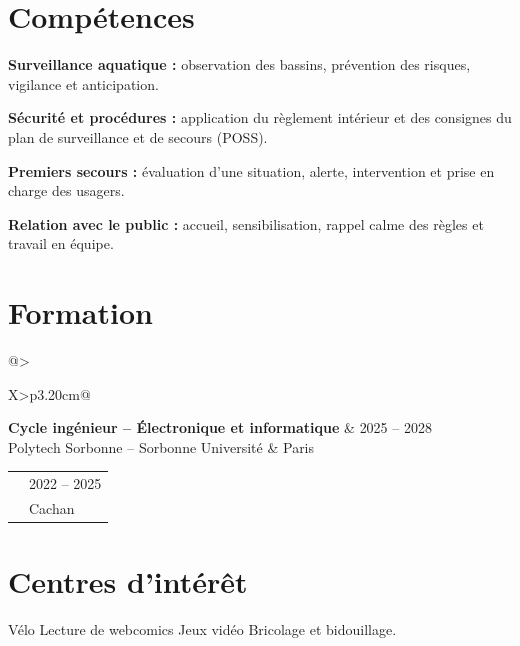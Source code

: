 \documentclass[10pt,a4paper]{extarticle}
\makeatletter
\newcommand{\entry}[4]{%
\begin{tabularx}{\linewidth}{@{}>{\raggedright\arraybackslash}X>{\raggedleft\arraybackslash}p{3.20cm}@{}}
 {\bfseries\color{bleu}#1} & {\fontsize{9.4}{10.8}\selectfont\color{secondaire}#2} \\[-1pt]
 {\fontsize{9.4}{11}\selectfont\color{secondaire}#3} & {\fontsize{9.4}{10.8}\selectfont\color{secondaire}#4}
\end{tabularx}\vspace{-2.5pt}\par}
\newcommand{\gapentry}{\vspace{5.4pt}}
\newcommand{\comp}[2]{\textbf{\color{bleu}#1} \hspace{2pt}#2\par}
\makeatother
\begin{document}
\section{Compétences}
{\fontsize{9.9}{12.2}\selectfont
\comp{Surveillance aquatique :}{observation des bassins, prévention des risques, vigilance et anticipation.}
\vspace{2.7pt}
\comp{Sécurité et procédures :}{application du règlement intérieur et des consignes du plan de surveillance et de secours (POSS).}
\vspace{2.7pt}
\comp{Premiers secours :}{évaluation d'une situation, alerte, intervention et prise en charge des usagers.}
\vspace{2.7pt}
\comp{Relation avec le public :}{accueil, sensibilisation, rappel calme des règles et travail en équipe.}
}

\section{Formation}
\entry{Cycle ingénieur -- Électronique et informatique}{2025 -- 2028}{Polytech Sorbonne -- Sorbonne Université}{Paris}
\gapentry
\entry{BUT Génie électrique et informatique industrielle (GEII)}{2022 -- 2025}{IUT de Cachan -- Université Paris-Saclay}{Cachan}

\section{Centres d'intérêt}
{\fontsize{9.9}{11.7}\selectfont
Vélo \textcolor{rouge}{\textbullet} Lecture de webcomics \textcolor{rouge}{\textbullet} Jeux vidéo \textcolor{rouge}{\textbullet} Bricolage et bidouillage.
}
\end{document}
